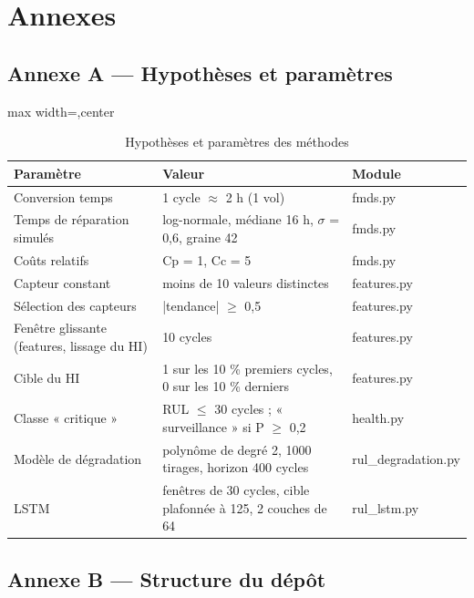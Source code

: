 \chapter*{Annexes}

\section*{Annexe A — Hypothèses et paramètres}

\begin{table}[htbp]
\centering\small
\begin{adjustbox}{max width=\linewidth,center}
\begin{tabular}{lll}
\toprule
Paramètre & Valeur & Module \\
\midrule
Conversion temps & 1 cycle \ensuremath{\approx} 2 h (1 vol) & fmds.py \\
Temps de réparation simulés & log-normale, médiane 16 h, \ensuremath{\sigma} = 0,6, graine 42 & fmds.py \\
Coûts relatifs & Cp = 1, Cc = 5 & fmds.py \\
Capteur constant & moins de 10 valeurs distinctes & features.py \\
Sélection des capteurs & |tendance| \ensuremath{\ge} 0,5 & features.py \\
Fenêtre glissante (features, lissage du HI) & 10 cycles & features.py \\
Cible du HI & 1 sur les 10 \% premiers cycles, 0 sur les 10 \% derniers & features.py \\
Classe « critique » & RUL \ensuremath{\le} 30 cycles ; « surveillance » si P \ensuremath{\ge} 0,2 & health.py \\
Modèle de dégradation & polynôme de degré 2, 1000 tirages, horizon 400 cycles & rul\_degradation.py \\
LSTM & fenêtres de 30 cycles, cible plafonnée à 125, 2 couches de 64 & rul\_lstm.py \\
\bottomrule
\end{tabular}
\end{adjustbox}
\caption{Hypothèses et paramètres des méthodes}\label{tab:hypotheses_parametres}
\end{table}

\section*{Annexe B — Structure du dépôt}

